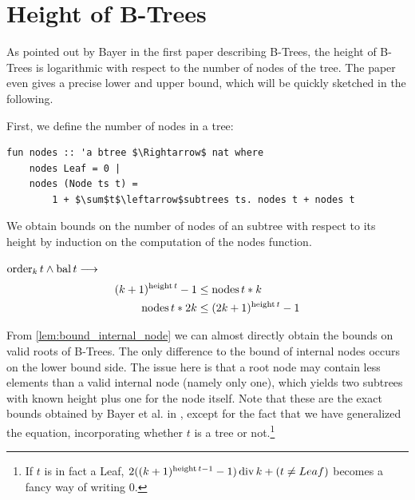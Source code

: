 \section{Height of B-Trees}

As pointed out by Bayer in the first paper describing B-Trees,
the height of B-Trees is logarithmic with respect to the number
of nodes of the tree. \parencite{DBLP:journals/acta/BayerM72}
The paper even gives a precise lower and upper bound, which will be quickly sketched in the following.

First, we define the number of nodes in a tree:
\begin{lstlisting}[mathescape=true, language=Isabelle]
fun nodes :: 'a btree $\Rightarrow$ nat where
    nodes Leaf = 0 |
    nodes (Node ts t) =
        1 + $\sum$t$\leftarrow$subtrees ts. nodes t + nodes t
\end{lstlisting}


We obtain bounds
on the number of nodes of an subtree with respect to its height
by induction on the computation of the nodes function.

\begin{lemma}
    \label{lem:bound_internal_node}
    $\operatorname{order}_k t \wedge \operatorname{bal} t \longrightarrow$
    \begin{align}
        (k+1)^{\operatorname{height} t} - 1 &\le \operatorname{nodes} t * k \\
        \operatorname{nodes} t * 2k &\le (2k+1)^{\operatorname{height} t} - 1
    \end{align}
\end{lemma}

From \autoref{lem:bound_internal_node} we can almost directly obtain
the bounds on valid roots of B-Trees.
The only difference to the bound of internal nodes occurs on the lower bound side.
The issue here is that a root node may contain less elements than
a valid internal node (namely only one), which yields two subtrees with known height
plus one for the node itself.
Note that these are the exact bounds obtained by Bayer et al. in \parencite{DBLP:journals/acta/BayerM72},
except for the fact that we have generalized the equation,
incorporating whether $t$ is a tree or not.\footnote{
    If $t$ is in fact a Leaf,
    $2((k+1)^{\operatorname{height} t - 1} - 1) \operatorname{div} k + (t \neq Leaf)$ becomes a fancy way of writing $0$.
}

